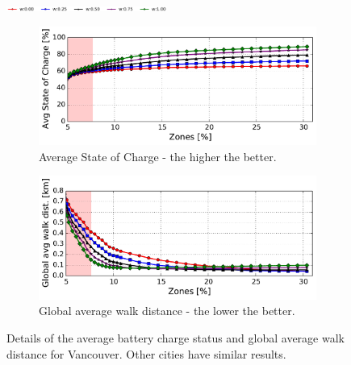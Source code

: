 \begin{figure}[t!]
    \begin{center}
	    \includegraphics[width=0.47\textwidth]{figures/legenda.pdf}
    \vspace{-0.1cm}
    \end{center}
    \begin{center}
        \begin{subfigure}{0.47\textwidth}
            \includegraphics[width=\columnwidth]{figures/cut_Vancouver_AvgSOCVsZones_Policy_44_tt-25_100_4.pdf}
            \caption{Average State of Charge - the higher the better.}
            \label{fig:6_7_zone_vs_soc_vancouver}
        \end{subfigure}
         \begin{subfigure}{0.47\textwidth}
            \includegraphics[width=\columnwidth]{figures/cut_Vancouver_TravelWithPenlatyVsZones_Policy_44_tt-25_100_4.pdf}
             \caption{Global average walk distance - the lower the better.}
             \label{fig:6_7_zone_vs_wwd_vancouver}
         \end{subfigure}
         \caption{Details of the average battery charge status and global average walk distance for Vancouver. Other cities have similar results.}
         \label{fig:6_7_discomoft_metrics_vancouver}
\end{center}
\end{figure}



